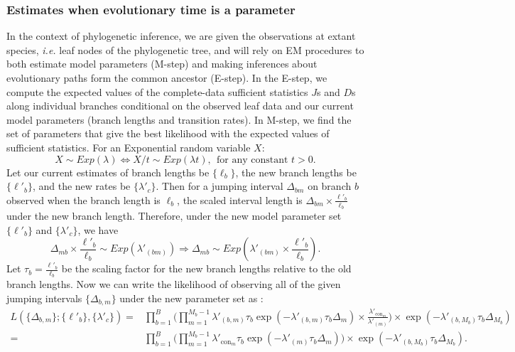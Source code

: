 \documentclass[11pt]{article}
\newcommand{\context}{\ensuremath{\mathrm{con}}}
\begin{document}
\subsubsection{Estimates when evolutionary time is a parameter}
In the context of phylogenetic inference, we are given the
observations at extant species, \textit{i.e.} leaf nodes of the
phylogenetic tree, and will rely on EM procedures to both estimate
model parameters (M-step) and making inferences about evolutionary
paths form the common ancestor (E-step).  In the E-step, we compute
the expected values of the complete-data sufficient statistics $J$s
and $D$s along individual branches conditional on the observed leaf
data and our current model parameters (branch lengths and transition
rates). In M-step, we find the set of parameters that give the best
likelihood with the expected values of sufficient
statistics. For an Exponential random variable
$X$:
\[
X \sim \mathit{Exp}(\lambda) \Leftrightarrow X/t \sim \mathit{Exp}(\lambda t),
~~ \text{for any constant $t>0$.}
\]
Let our current estimates of branch lengths be $\{\ell_b\}$, the new
branch lengths be $\{\ell'_b\}$, and the new rates be
$\{\lambda'_c\}$. Then for a jumping interval $\Delta_{bm}$ on branch
$b$ observed when the branch length is $\ell_b$, the scaled interval
length is $\Delta_{bm}\times \frac{\ell'_b}{\ell_b}$ under the new
branch length. Therefore, under the new model parameter set
$\{\ell'_b\}$ and $\{\lambda'_c\}$, we have
\[
\Delta_{mb}\times \frac{\ell'_b}{\ell_b} \sim \mathit{Exp}(\lambda'_{(bm)}) \Rightarrow
\Delta_{mb} \sim \mathit{Exp}(\lambda'_{(bm)} \times \frac{\ell'_b}{\ell_b}).
\]
Let $\tau_b = \frac{\ell'_b}{\ell_b}$ be the scaling factor for the
new branch lengths relative to the old branch lengths. Now we can
write the likelihood of observing all of the given jumping intervals
$\{\Delta_{b,m}\}$ under the new parameter set as :
\begin{equation}\label{eqn:liknew}
  \begin{aligned}
    L(\{\Delta_{b,m}\}; \{\ell'_b\}, \{\lambda'_c\})
    = & \prod_{b=1}^B\Bigg(\prod_{m=1}^{M_b-1}
    \lambda'_{(b,m)}\tau_b
    \exp(-\lambda'_{(b,m)}\tau_b\Delta_m) \times \frac{\lambda'_{\context{}_m}}{\lambda'_{(m)}}
    \Bigg) \times \exp(-\lambda'_{(b,M_b)}\tau_b\Delta_{M_b})\\
    = & \prod_{b=1}^B\Bigg(
    \prod_{m=1}^{M_b-1}\lambda'_{\context{}_m}\tau_b\exp(-\lambda'_{(m)}\tau_b\Delta_m)
    \Bigg)\times \exp(-\lambda'_{(b,M_b)}\tau_b\Delta_{M_b}).
  \end{aligned}
\end{equation}
\end{document}
